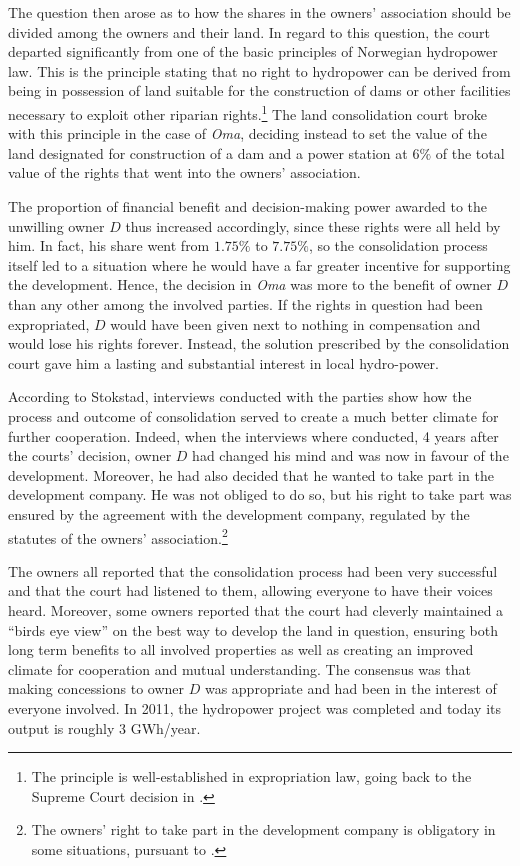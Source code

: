The question then arose as to how the shares in the owners' association should be divided among the owners and their land. In regard to this question, the court departed significantly from one of the basic principles of Norwegian hydropower law. This is the principle stating that no right to hydropower can be derived from being in possession of land suitable for the construction of dams or other facilities necessary to exploit other riparian rights.\footnote{The principle is well-established in expropriation law, going back to the Supreme Court decision in \cite{herlandsfossen22}.} The land consolidation court broke with this principle in the case of \emph{Oma}, deciding instead to set the value of the land designated for construction of a dam and a power station at $6 \%$ of the total value of the rights that went into the owners' association. 

The proportion of financial benefit and decision-making power awarded to the unwilling owner $D$ thus increased accordingly, since these rights were all held by him. In fact, his share went from $1.75 \%$ to $7.75 \%$, so the consolidation process itself led to a situation where he would have a far greater incentive for supporting the development. Hence, the decision in \emph{Oma} was more to the benefit of owner $D$ than any other among the involved parties. If the rights in question had been expropriated, $D$ would have been given next to nothing in compensation and would lose his rights forever. Instead, the solution prescribed by the consolidation court gave him a lasting and substantial interest in local hydro-power.

According to Stokstad, interviews conducted with the parties show how the process and outcome of consolidation served to create a much better climate for further cooperation.  Indeed, when the interviews where conducted, 4 years after the courts' decision, owner $D$ had changed his mind and was now in favour of the development. Moreover, he had also decided that he wanted to take part in the development company. He was not obliged to do so, but his right to take part was ensured by the agreement with the development company, regulated by the statutes of the owners' association.\footnote{The owners' right to take part in the development company is obligatory in some situations, pursuant to \cite[34 b) no 3]{lca79}.}

The owners all reported that the consolidation process had been very successful and that the court had listened to them, allowing everyone to have their voices heard. Moreover, some owners reported that the court had cleverly maintained a ``birds eye view'' on the best way to develop the land in question, ensuring both long term benefits to all involved properties as well as creating an improved climate for cooperation and mutual understanding. The consensus was that making concessions to owner $D$ was appropriate and had been in the interest of everyone involved. In 2011, the hydropower project was completed and today its output is roughly 3 GWh/year.

